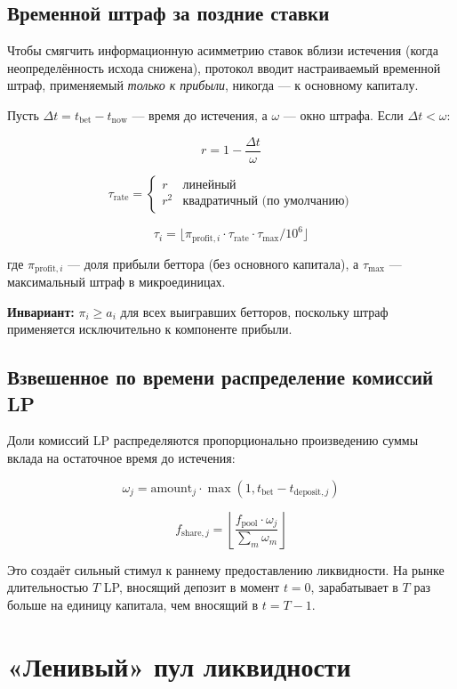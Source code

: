\documentclass{ledger}
\theoremstyle{plain}
\theoremstyle{remark}
\begin{document}
\subsection{Временной штраф за поздние ставки}\label{sec:timepenalty}

Чтобы смягчить информационную асимметрию ставок вблизи истечения (когда
неопределённость исхода снижена), протокол вводит настраиваемый временной штраф,
применяемый \emph{только к прибыли}, никогда --- к основному капиталу.

Пусть $\Delta t = t_{\text{bet}} - t_{\text{now}}$ --- время до истечения, а
$\omega$ --- окно штрафа. Если $\Delta t < \omega$:

\[
r = 1 - \frac{\Delta t}{\omega}
\]

\[
\tau_{\text{rate}} = \begin{cases} r & \text{линейный} \\ r^2 &
\text{квадратичный (по умолчанию)} \end{cases}
\]

\[
\tau_i = \lfloor \pi_{\text{profit},i} \cdot \tau_{\text{rate}} \cdot
\tau_{\max} / 10^6 \rfloor
\]

где $\pi_{\text{profit},i}$ --- доля прибыли беттора (без основного капитала), а
$\tau_{\max}$ --- максимальный штраф в микроединицах.

\textbf{Инвариант:} $\pi_i \geq a_i$ для всех выигравших бетторов, поскольку штраф
применяется исключительно к компоненте прибыли.

\subsection{Взвешенное по времени распределение комиссий LP}\label{sec:lpfee}

Доли комиссий LP распределяются пропорционально произведению суммы вклада на
остаточное время до истечения:

\[
\omega_j = \text{amount}_j \cdot \max(1, t_{\text{bet}} - t_{\text{deposit},j})
\]

\[
f_{\text{share},j} = \left\lfloor \frac{f_{\text{pool}} \cdot \omega_j}{\sum_m
\omega_m} \right\rfloor
\]

Это создаёт сильный стимул к раннему предоставлению ликвидности. На рынке
длительностью $T$ LP, вносящий депозит в момент $t = 0$, зарабатывает в $T$ раз
больше на единицу капитала, чем вносящий в $t = T - 1$.

\section{«Ленивый» пул ликвидности}\label{sec:lazypool}
\end{document}
